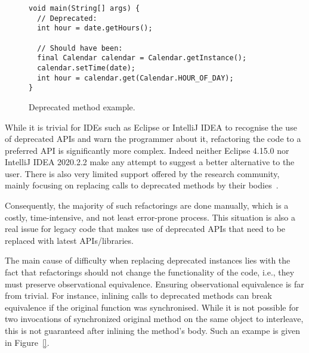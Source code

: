 \documentclass[runningheads,a4paper]{llncs}
\begin{document}
\begin{figure}
\begin{lstlisting}[mathescape=true,showstringspaces=false]
void main(String[] args) {
  // Deprecated:
  int hour = date.getHours();
  
  // Should have been:
  final Calendar calendar = Calendar.getInstance();
  calendar.setTime(date);
  int hour = calendar.get(Calendar.HOUR_OF_DAY);
}
\end{lstlisting}
\caption{Deprecated method example.}
\label{ex:deprecated-method-other}
\end{figure}


While it is trivial for IDEs such as Eclipse or IntelliJ IDEA to
recognise the use of deprecated APIs and warn the programmer about it,
refactoring the code to a preferred API is significantly more
complex. Indeed neither Eclipse 4.15.0 nor IntelliJ IDEA 2020.2.2 make
any attempt to suggest a better alternative to the user. There is also
very limited support offered by the research community, mainly
focusing on replacing calls to deprecated methods by their
bodies~\cite{DBLP:conf/paste/Perkins05}. 

Consequently, the majority of
such refactorings are done manually, which is a costly,
time-intensive, and not least error-prone process.  This situation is
also a real issue for legacy code that makes use of deprecated APIs
that need to be replaced with latest APIs/libraries.

The main cause of difficulty when replacing deprecated instances lies
with the fact that refactorings should not change the functionality of
the code, i.e., they must preserve observational equivalence.
Ensuring observational equivalence is far from trivial.  For instance,
inlining calls to deprecated methods can break equivalence if the
original function was synchronised.  While it is not possible for two
invocations of synchronized original method on the same object to
interleave, this is not guaranteed after inlining the method's body.
Such an exampe is given in Figure~\ref{}.

\end{document}
